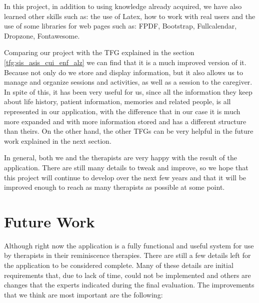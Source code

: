 In this project, in addition to using knowledge already acquired, we have also learned other skills such as: the use of Latex, how to work with real users and the use of some libraries for web pages such as: FPDF, Bootstrap, Fullcalendar, Dropzone, Fontawesome.

Comparing our project with the TFG explained in the section \ref{tfg:sis_asis_cui_enf_alz} we can find that it is a much improved version of it. Because not only do we store and display information, but it also allows us to manage and organize sessions and activities, as well as a session to the caregiver. In spite of this, it has been very useful for us, since all the information they keep about life history, patient information, memories and related people, is all represented in our application, with the difference that in our case it is much more expanded and with more information stored and has a different structure than theirs. On the other hand, the other TFGs can be very helpful in the future work explained in the next section.

In general, both we and the therapists are very happy with the result of the application. There are still many details to tweak and improve, so we hope that this project will continue to develop over the next few years and that it will be improved enough to reach as many therapists as possible at some point.

\section{Future Work}

Although right now the application is a fully functional and useful system for use by therapists in their reminiscence therapies. There are still a few details left for the application to be considered complete. Many of these details are initial requirements that, due to lack of time, could not be implemented and others are changes that the experts indicated during the final evaluation. The improvements that we think are most important are the following:

